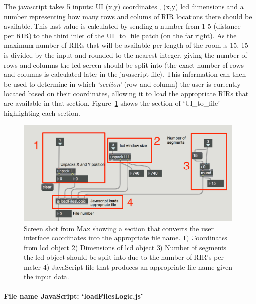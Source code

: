 \documentclass[../../main.tex]{subfiles}
\begin{document}
			The javascript takes 5 inputs: UI (x,y) coordinates , (x,y) lcd dimensions and a number representing how many rows and colums of \ac{RIR} locations there should be available. This last value is calculated by sending a number from 1-5 (distance per RIR) to the third inlet of the UI\_to\_file patch (on the far right). As the maximum number of RIRs that will be available per length of the room is 15, 15 is divided by the input and rounded to the nearest integer, giving the number of rows and columns the lcd screen should be split into (the exact number of rows and columns is calculated later in the javascript file). This information can then be used to determine in which \textit{‘section’} (row and column) the user is currently located based on their coordinates, allowing it to load the appropriate RIRs that are available in that section. Figure~\ref{locationsConvert} shows the section of `UI\_to\_file' highlighting each section.

			\begin{figure}[H]
				\centerline{\includegraphics[scale = 0.6]{Sections/Implementation/Max/images/Max/UI_to_file_edit_4.png}}
				\caption{Screen shot from Max showing a section that converts the user interface coordinates into the appropriate file name. 1) Coordinates from lcd object 2) Dimensions of lcd object 3) Number of segments the lcd object should be split into due to the number of \ac{RIR}'s per meter 4) JavaScript file that produces an appropriate file name given the input data.}
				\label{locationsConvert}
			\end{figure}

			\paragraph{File name JavaScript: `loadFilesLogic.js'}
\end{document}
